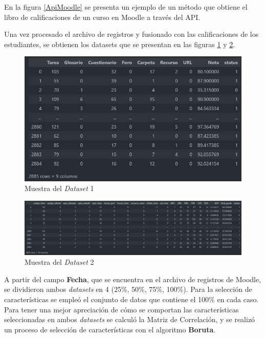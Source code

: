 En la figura \ref{ApiMoodle} se presenta un ejemplo de un método que obtiene el libro de calificaciones de un curso en Moodle a través del API. 

Una vez procesado el archivo de registros y fusionado con las calificaciones de los estudiantes, se obtienen los datasets que se presentan en las figuras \ref{dataset1_view} y \ref{dataset2_view}.  


\begin{figure}
    \centering
    \includegraphics[width = 1 \textwidth]{Graphics/dataset1_view.jpg}
    \caption{Muestra del \textit{Dataset} 1}
    \label{dataset1_view}
\end{figure}

\begin{figure}
    \centering
    \includegraphics[width = 1 \textwidth]{Graphics/dataset2_view.jpg}
    \caption{Muestra del \textit{Dataset} 2}
    \label{dataset2_view}
\end{figure}  


A partir del campo \textbf{Fecha}, que se encuentra en el archivo de registros de Moodle, se dividieron ambos \textit{datasets} en 4 (25\%, 50\%, 75\%, 100\%). Para la selección de características 
se empleó el conjunto de datos que contiene el 100\% en cada caso. Para tener una mejor apreciación de cómo se comportan las características seleccionadas en ambos \textit{datasets} se calculó la 
Matriz de Correlación, y se realizó un proceso de selección de características con el algoritmo \textbf{Boruta}.  

